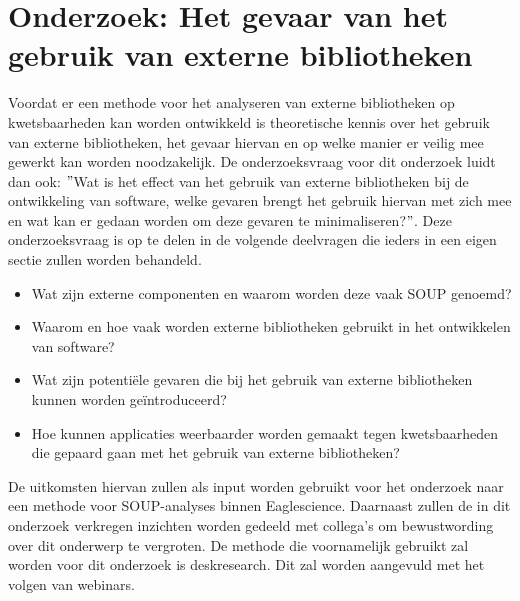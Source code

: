 
\chapter{Onderzoek: Het gevaar van het gebruik van externe bibliotheken}\label{ch:externeBibliothekengebruikGevaren}
Voordat er een methode voor het analyseren van externe bibliotheken op kwetsbaarheden kan worden ontwikkeld is theoretische kennis over het gebruik van externe bibliotheken, het gevaar hiervan en op welke manier er veilig mee gewerkt kan worden noodzakelijk. De onderzoeksvraag voor dit onderzoek luidt dan ook: $"$Wat is het effect van het gebruik van externe bibliotheken bij de ontwikkeling van software, welke gevaren brengt het gebruik hiervan met zich mee en wat kan er gedaan worden om deze gevaren te minimaliseren?$"$. Deze onderzoeksvraag is op te delen in de volgende deelvragen die ieders in een eigen sectie zullen worden behandeld.

\begin{itemize}
    \item Wat zijn externe componenten en waarom worden deze vaak SOUP genoemd?
    \item Waarom en hoe vaak worden externe bibliotheken gebruikt in het ontwikkelen van software?
    \item Wat zijn potentiële gevaren die bij het gebruik van externe bibliotheken kunnen worden geïntroduceerd?
    \item Hoe kunnen applicaties weerbaarder worden gemaakt tegen kwetsbaarheden die gepaard gaan met het gebruik van externe bibliotheken?
\end{itemize}
De uitkomsten hiervan zullen als input worden gebruikt voor het onderzoek naar een methode voor SOUP-analyses binnen Eaglescience. Daarnaast zullen de in dit onderzoek verkregen inzichten worden gedeeld met collega's om bewustwording over dit onderwerp te vergroten. De methode die voornamelijk gebruikt zal worden voor dit onderzoek is deskresearch. Dit zal worden aangevuld met het volgen van webinars.

